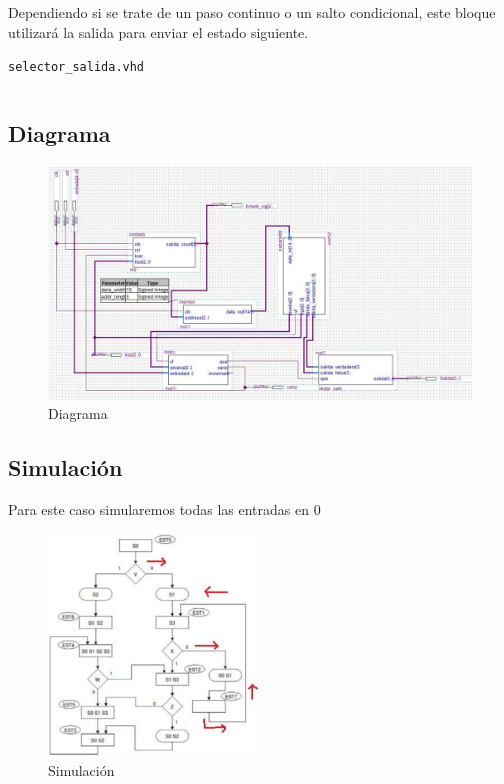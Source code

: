 \documentclass[table]{scrartcl}
\newenvironment{code}{\captionsetup{type=listing}}{}
\begin{document}
Dependiendo si se trate de un paso continuo o un salto condicional, este bloque
utilizará la salida para enviar el estado siguiente.
\begin{code}
  \caption{\texttt{selector_salida.vhd}}
  \inputminted{vhdl}{./selector_salida.vhd}
\end{code}

\subsection{Diagrama}\label{sec:diagrama}
\begin{figure}[H]
    \centering
    \includegraphics[width=\textwidth]{./img/dia}
    \caption{Diagrama}
\end{figure}

\newpage{}

\subsection{Simulación}\label{sec:simulacion}
Para este caso simularemos todas las entradas en $0$
\begin{figure}[H]
  \centering
    \includegraphics[width=0.5\textwidth]{./img/ruta_asm}
  \caption{Simulación}\label{fig:ruta}
\end{figure}
\end{document}

